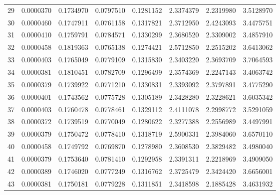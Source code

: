 \documentclass[11pt]{scrartcl}
\theoremstyle{dotlessP}
\theoremstyle{dotlessN}
\theoremstyle{dotN}
\begin{document}
\begin{table}[H]
{\begin{tabular}{c|c|c|c|c|c|c|c}
29    & 0.0000370 & 0.1734970       & 0.0797510     & 0.1281152           & 2.3374379          & 2.2319980        & 3.5128970              \\
30    & 0.0000460 & 0.1747911       & 0.0761158     & 0.1317821           & 2.3712950          & 2.4243093        & 3.4475751              \\
31    & 0.0000410 & 0.1759791       & 0.0784571     & 0.1330299           & 2.3680520          & 2.3309002        & 3.4857910              \\
32    & 0.0000458 & 0.1819363       & 0.0765138     & 0.1274421           & 2.5712850          & 2.2515202        & 3.6413062              \\
33    & 0.0000403 & 0.1765049       & 0.0779109     & 0.1315830           & 2.3403220          & 2.3693709        & 3.7064593              \\
34    & 0.0000381 & 0.1810451       & 0.0782709     & 0.1296499           & 2.3574369          & 2.2247143        & 3.4063742              \\
35    & 0.0000379 & 0.1739922       & 0.0771210     & 0.1330831           & 2.3393092          & 2.3797891        & 3.4775290              \\
36    & 0.0000401 & 0.1743562       & 0.0775728     & 0.1305189           & 2.3428280          & 2.3228621        & 3.6035342              \\
37    & 0.0000403 & 0.1760478       & 0.0778461     & 0.1329112           & 2.4111078          & 2.2998772        & 3.5291059              \\
38    & 0.0000372 & 0.1739519       & 0.0770049     & 0.1280622           & 2.3277388          & 2.2556989        & 3.4497991              \\
39    & 0.0000379 & 0.1750472       & 0.0778410     & 0.1318719           & 2.5900331          & 2.3984060        & 3.6570110              \\
40    & 0.0000458 & 0.1749792       & 0.0769870     & 0.1278980           & 2.3608530          & 2.3829482        & 3.4980040              \\
41    & 0.0000379 & 0.1753640       & 0.0781410     & 0.1292958           & 2.3391311          & 2.2218969        & 3.4909050              \\
42    & 0.0000389 & 0.1746020       & 0.0777249     & 0.1316762           & 2.3725479          & 2.3424420        & 3.6656001              \\
43    & 0.0000381 & 0.1750181       & 0.0779228     & 0.1311851           & 2.3418598          & 2.1885428        & 3.4631932              \\

\end{tabular}}
\end{table}
\end{document}
